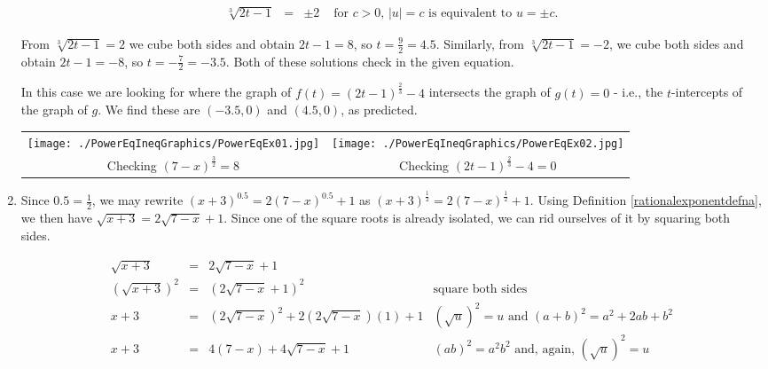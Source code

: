 \documentclass{ximera}
\begin{document}
\begin{example}
\begin{enumerate}
\[\begin{array}{rclr}
\sqrt[3]{2t-1} & = & \pm 2 & \text{ for $c>0$, $|u| = c$ is equivalent to $u = \pm c$.} \end{array} \]

From $\sqrt[3]{2t-1}  = 2$ we cube both sides and obtain $2t-1 = 8$, so $t = \frac{9}{2} = 4.5$.  Similarly, from $\sqrt[3]{2t-1}  = -2$, we cube both sides and obtain $2t-1 = -8$, so $t = -\frac{7}{2} = -3.5$.  Both of these solutions check in the given equation.

In this case we are looking for where the graph of $f(t) = (2t-1)^{\frac{2}{3}} -4$ intersects the graph of $g(t) = 0$ - i.e., the $t$-intercepts of the graph of $g$.  We find these are $(-3.5,0)$ and $(4.5,0)$, as predicted.

\begin{center}

\begin{tabular}{cc}

\texttt{[image: ./PowerEqIneqGraphics/PowerEqEx01.jpg]} & \texttt{[image: ./PowerEqIneqGraphics/PowerEqEx02.jpg]} \\

Checking $(7-x)^{\frac{3}{2}} = 8$  & Checking  $(2t-1)^{\frac{2}{3}} -4 = 0$ \\

\end{tabular}

\end{center} 

\item Since $0.5 = \frac{1}{2}$, we may rewrite $(x+3)^{0.5} = 2(7-x)^{0.5}+1$ as  $(x+3)^{\frac{1}{2}} = 2(7-x)^{\frac{1}{2}}+1$.  Using Definition \ref{rationalexponentdefna}, we then have $\sqrt{x+3} = 2\sqrt{7-x} + 1$.  Since one of the square roots is already isolated, we can rid ourselves of it by squaring both sides.

\[ \begin{array}{rclr}

\sqrt{x+3} & = & 2\sqrt{7-x} + 1 & \\

 (\sqrt{x+3})^2 & = & (2\sqrt{7-x} + 1)^2 & \text{square both sides} \\
 
 x+3 & = & (2 \sqrt{7-x})^2 + 2 (2 \sqrt{7-x})(1) + 1 & \text{$(\sqrt{u})^2 = u$ and $(a+b)^2 = a^2 + 2ab +b^2$} \\

 
 x+3 & = & 4(7-x) + 4\sqrt{7-x} + 1 &  \text{$(ab)^2 = a^2b^2$ and, again, $(\sqrt{u})^2 = u$} \\
 

\end{array}\]
\end{enumerate}
\end{example}
\end{document}
